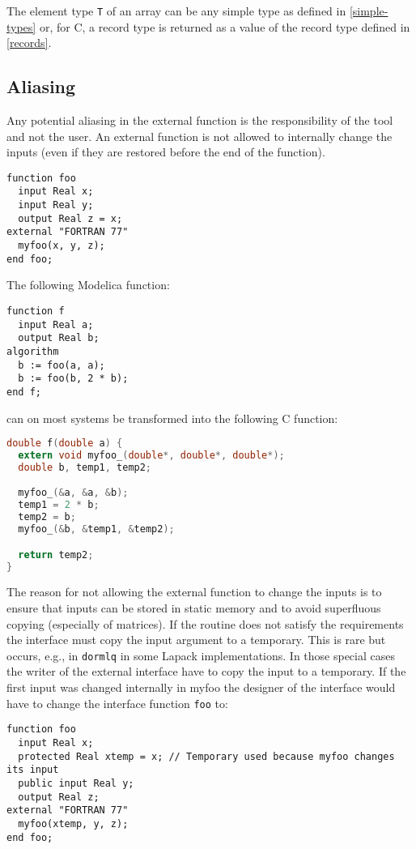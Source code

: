 The element type {\lstinline!T!} of an array can be any simple type as defined in \cref{simple-types} or, for C, a record type is returned as a value of the record type defined in \cref{records}.

\subsection{Aliasing}\label{aliasing}

Any potential aliasing in the external function is the responsibility of
the tool and not the user. An external function is not allowed to
internally change the inputs (even if they are restored before the end
of the function).

\begin{example}
\begin{lstlisting}[language=modelica]
function foo
  input Real x;
  input Real y;
  output Real z = x;
external "FORTRAN 77"
  myfoo(x, y, z);
end foo;
\end{lstlisting}
The following Modelica function:
\begin{lstlisting}[language=modelica]
function f
  input Real a;
  output Real b;
algorithm
  b := foo(a, a);
  b := foo(b, 2 * b);
end f;
\end{lstlisting}
can on most systems be transformed into the following C function:
\begin{lstlisting}[language=C]
double f(double a) {
  extern void myfoo_(double*, double*, double*);
  double b, temp1, temp2;

  myfoo_(&a, &a, &b);
  temp1 = 2 * b;
  temp2 = b;
  myfoo_(&b, &temp1, &temp2);

  return temp2;
}
\end{lstlisting}

The reason for not allowing the external function to change the
inputs is to ensure that inputs can be stored in static memory and to
avoid superfluous copying (especially of matrices). If the routine does
not satisfy the requirements the interface must copy the input argument
to a temporary. This is rare but occurs, e.g., in {\lstinline!dormlq!} in some
Lapack implementations. In those special cases the writer of the
external interface have to copy the input to a temporary. If the first
input was changed internally in myfoo the designer of the interface
would have to change the interface function {\lstinline!foo!} to:
\begin{lstlisting}[language=modelica]
function foo
  input Real x;
  protected Real xtemp = x; // Temporary used because myfoo changes its input
  public input Real y;
  output Real z;
external "FORTRAN 77"
  myfoo(xtemp, y, z);
end foo;
\end{lstlisting}


\end{example}
